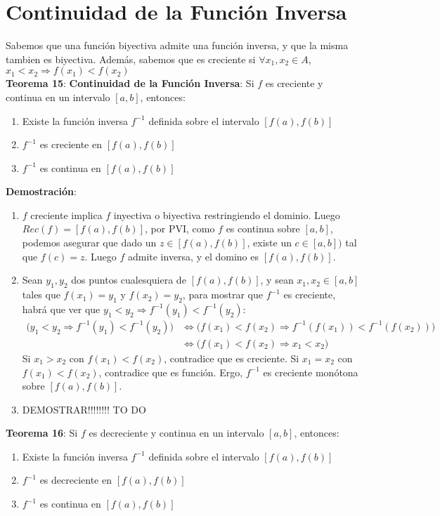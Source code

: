 \documentclass[11pt,a4paper]{article}
\begin{document}
\section{Continuidad de la Funci\'on Inversa}
Sabemos que una funci\'on biyectiva admite una funci\'on inversa, y que la misma tambien es biyectiva. Adem\'as, sabemos que es creciente si $\forall x_1, x_2 \in A$, $x_1 < x_2 \Rightarrow f(x_1) < f(x_2)$\\

\noindent \textbf{Teorema 15}: \textbf{Continuidad de la Funci\'on Inversa}: Si $f$ es creciente y continua en un intervalo $[a,b]$, entonces:
\begin{enumerate}
\item Existe la funci\'on inversa $f^{-1}$ definida sobre el intervalo $[f(a),f(b)]$
\item $f^{-1}$ es creciente en $[f(a),f(b)]$
\item $f^{-1}$ es continua en $[f(a),f(b)]$
\end{enumerate}
\textbf{Demostraci\'on}: 
\begin{enumerate}
\item $f$ creciente implica $f$ inyectiva o biyectiva restringiendo el dominio. Luego $Rec(f)=[f(a),f(b)]$, por PVI, como $f$ es continua sobre $[a,b]$, podemos asegurar que dado un $z\in[f(a),f(b)]$, existe un $c\in[a,b])$ tal que $f(c) = z$. Luego $f$ admite inversa, y el domino es $[f(a),f(b)]$.
\item Sean $y_1, y_2$ dos puntos cualesquiera de $[f(a),f(b)]$, y sean $x_1, x_2 \in [a,b]$ tales que $f(x_1)=y_1$ y $f(x_2)=y_2$, para mostrar que $f^{-1}$ es creciente, habr\'a que ver que $y_1<y_2 \Rightarrow f^{-1}(y_1) < f^{-1}(y_2)$:
\begin{align*}
\bigg( y_1<y_2 \Rightarrow f^{-1}(y_1) < f^{-1}(y_2) \bigg) & \iff \bigg( f(x_1)<f(x_2) \Rightarrow f^{-1}(f(x_1)) < f^{-1}(f(x_2)) \bigg)\\
& \iff \bigg( f(x_1)<f(x_2) \Rightarrow x_1 <x_2 \bigg)
\end{align*}
Si $x_1 > x_2$ con $f(x_1)<f(x_2)$, contradice que es creciente. Si $x_1 = x_2$ con $f(x_1)<f(x_2)$, contradice que es funci\'on. Ergo, $f^{-1}$ es creciente mon\'otona sobre $[f(a),f(b)]$.
\item DEMOSTRAR!!!!!!!! TO DO
\end{enumerate}

\noindent \textbf{Teorema 16}: Si $f$ es decreciente y continua en un intervalo $[a,b]$, entonces:
\begin{enumerate}
\item Existe la funci\'on inversa $f^{-1}$ definida sobre el intervalo $[f(a),f(b)]$
\item $f^{-1}$ es decreciente en $[f(a),f(b)]$
\item $f^{-1}$ es continua en $[f(a),f(b)]$
\end{enumerate}
\end{document}
